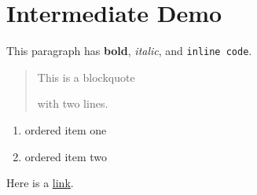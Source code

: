 \documentclass{article}
\begin{document}
\section{ Intermediate Demo}

This paragraph has \textbf{bold}, \emph{italic}, and \texttt{inline code}.

\begin{quote}
 This is a blockquote

 with two lines.

\end{quote}

\begin{enumerate}
\item  ordered item one
\item  ordered item two
\end{enumerate}

Here is a \href{https://example.com}{link}.
\end{document}
